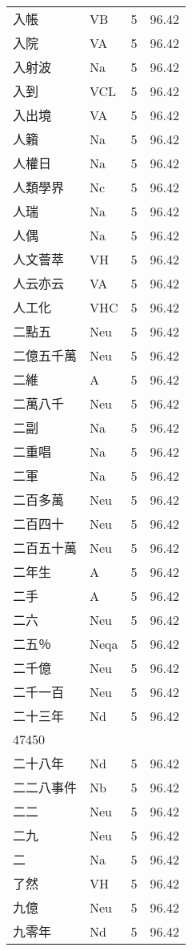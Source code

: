 \documentclass[twocolumn]{book}
\begin{document}
\begin{supertabular}{llrr}
入帳 & VB & 5 &  96.42\\
入院 & VA & 5 &  96.42\\
入射波 & Na & 5 &  96.42\\
入到 & VCL & 5 &  96.42\\
入出境 & VA & 5 &  96.42\\
人籟 & Na & 5 &  96.42\\
人權日 & Na & 5 &  96.42\\
人類學界 & Nc & 5 &  96.42\\
人瑞 & Na & 5 &  96.42\\
人偶 & Na & 5 &  96.42\\
人文薈萃 & VH & 5 &  96.42\\
人云亦云 & VA & 5 &  96.42\\
人工化 & VHC & 5 &  96.42\\
二點五 & Neu & 5 &  96.42\\
二億五千萬 & Neu & 5 &  96.42\\
二維 & A & 5 &  96.42\\
二萬八千 & Neu & 5 &  96.42\\
二副 & Na & 5 &  96.42\\
二重唱 & Na & 5 &  96.42\\
二軍 & Na & 5 &  96.42\\
二百多萬 & Neu & 5 &  96.42\\
二百四十 & Neu & 5 &  96.42\\
二百五十萬 & Neu & 5 &  96.42\\
二年生 & A & 5 &  96.42\\
二手 & A & 5 &  96.42\\
二六 & Neu & 5 &  96.42\\
二五％ & Neqa & 5 &  96.42\\
二千億 & Neu & 5 &  96.42\\
二千一百 & Neu & 5 &  96.42\\
二十三年 & Nd & 5 &  96.42\\
47450\\
二十八年 & Nd & 5 &  96.42\\
二二八事件 & Nb & 5 &  96.42\\
二二 & Neu & 5 &  96.42\\
二九 & Neu & 5 &  96.42\\
二 & Na & 5 &  96.42\\
了然 & VH & 5 &  96.42\\
九億 & Neu & 5 &  96.42\\
九零年 & Nd & 5 &  96.42\\

\end{supertabular}
\end{document}
